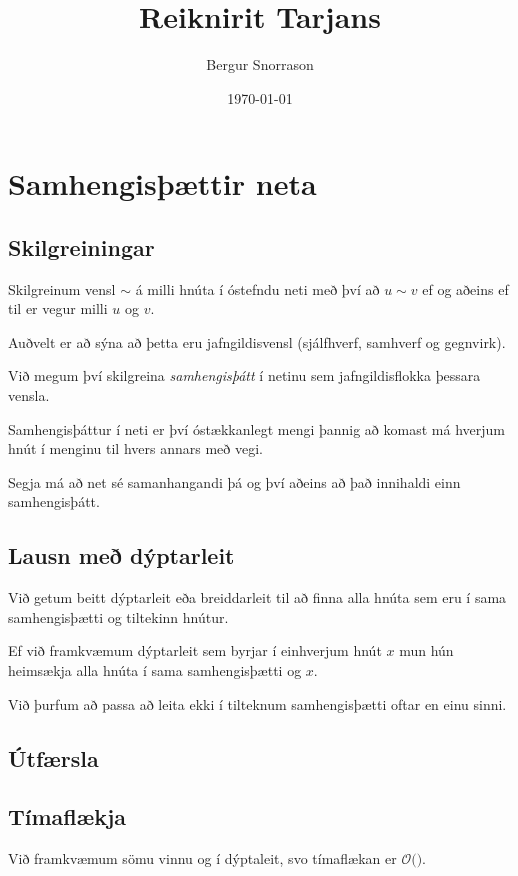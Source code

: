 \title{Reiknirit Tarjans}
\author{Bergur Snorrason}
\date{\today}



\frame{\titlepage}

\section{Samhengisþættir neta}
\subsection{Skilgreiningar}
{
	{
		\item<1-> Skilgreinum vensl $\sim$ á milli hnúta í óstefndu neti með því að $u \sim v$ ef og aðeins ef til er vegur milli $u$ og $v$.
		\item<2-> Auðvelt er að sýna að þetta eru jafngildisvensl (sjálfhverf, samhverf og gegnvirk).
		\item<3-> Við megum því skilgreina \emph{samhengisþátt} í netinu sem jafngildisflokka þessara vensla.
		\item<4-> Samhengisþáttur í neti er því óstækkanlegt mengi þannig að komast má hverjum hnút í menginu til hvers annars með vegi.
		\item<5-> Segja má að net sé samanhangandi þá og því aðeins að það innihaldi einn samhengisþátt.
	}
}

\subsection{Lausn með dýptarleit}
{
	{
		\item<1-> Við getum beitt dýptarleit eða breiddarleit til að finna alla hnúta sem eru í sama samhengisþætti og tiltekinn hnútur.
		\item<2-> Ef við framkvæmum dýptarleit sem byrjar í einhverjum hnút $x$ mun hún heimsækja alla hnúta í sama samhengisþætti og $x$.
		\item<3-> Við þurfum að passa að leita ekki í tilteknum samhengisþætti oftar en einu sinni.
	}
}

\subsection{Útfærsla}
{
}

\subsection{Tímaflækja}
{
	{
		\item<1-> Við framkvæmum sömu vinnu og í dýptaleit, svo tímaflækan er $\mathcal{O}($\onslide<2->{$E + V$}$)$.
	}
}

